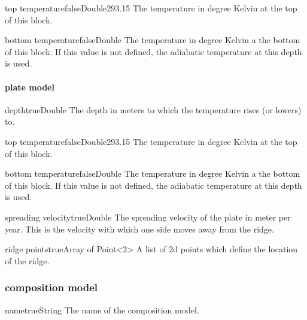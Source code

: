 \documentclass{book}
\begin{document}
\begin{parameterbox}{top temperature}{false}{Double}{293.15}
The temperature in degree Kelvin at the top of this block.
\end{parameterbox}

\begin{parameterbox}{bottom temperature}{false}{Double}{}
The temperature in degree Kelvin a the bottom of this block. If this value is not defined, the adiabatic temperature at this depth is used.
\end{parameterbox}


\paragraph{plate model}
\begin{parameterbox}{depth}{true}{Double}{}
The depth in meters to which the temperature rises (or lowers) to.
\end{parameterbox}

\begin{parameterbox}{top temperature}{false}{Double}{293.15}
The temperature in degree Kelvin at the top of this block.
\end{parameterbox}

\begin{parameterbox}{bottom temperature}{false}{Double}{}
The temperature in degree Kelvin a the bottom of this block. If this value is not defined, the adiabatic temperature at this depth is used.
\end{parameterbox}

\begin{parameterbox}{spreading velocity}{true}{Double}{}
The spreading velocity of the plate in meter per year. This is the velocity with which one side moves away from the ridge.
\end{parameterbox}

\begin{parameterbox}{ridge points}{true}{Array of Point<2>}{}
A list of 2d points which define the location of the ridge.
\end{parameterbox}

\subsubsection{composition model}
\begin{parameterbox}{name}{true}{String}{}
The name of the composition model.
\end{parameterbox}
\end{document}
